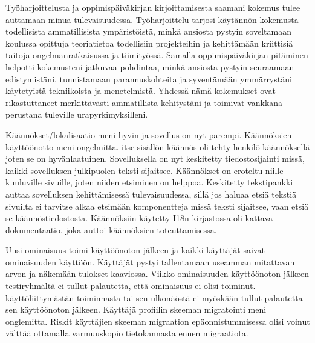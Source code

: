 \documentclass[11pt,a4paper,titlepage,oneside]{article}
\begin{document}
\medskip




%
Työharjoittelusta ja oppimispäiväkirjan kirjoittamisesta saamani kokemus tulee auttamaan minua tulevaisuudessa.
Työharjoittelu tarjosi käytännön kokemusta todellisista ammatillisista ympäristöistä,
minkä ansiosta pystyin soveltamaan koulussa opittuja teoriatietoa todellisiin projekteihin ja kehittämään kriittisiä taitoja 
ongelmanratkaisussa ja tiimityössä.
Samalla oppimispäiväkirjan pitäminen helpotti kokemusteni jatkuvaa pohdintaa,
minkä ansiosta pystyin seuraamaan edistymistäni,
tunnistamaan parannuskohteita ja syventämään ymmärrystäni käytetyistä tekniikoista ja menetelmistä.
Yhdessä nämä kokemukset ovat rikastuttaneet merkittävästi ammatillista kehitystäni ja toimivat vankkana perustana tuleville urapyrkimyksilleni.
\medskip













\iffalse

Käännökset/lokalisaatio meni hyvin ja sovellus on nyt parempi.
Käännöksien käyttöönotto meni ongelmitta.
itse sisällön käännös oli tehty henkilö käännöksellä joten se on hyvänlaatuinen.
%
Sovelluksella on nyt keskitetty tiedostosijainti missä, kaikki sovelluksen julkipuolen teksti sijaitsee.
Käännökset on eroteltu niille kuuluville sivuille, joten niiden etsiminen on helppoa.
Keskitetty tekstipankki auttaa sovelluksen kehittämisessä tulevaisuudessa,
sillä jos haluaa etsiä tekstiä sivuilta ei tarvitse alkaa etsimään komponentteja missä teksti sijaitsee,
vaan etsiä se käännöstiedostosta.
%
Käännöksiin käytetty I18n kirjastossa oli kattava dokumentaatio, joka auttoi käännöksien toteuttamisessa.
\medskip



Uusi ominaisuus toimi käyttöönoton jälkeen ja kaikki käyttäjät saivat ominaisuuden käyttöön.
Käyttäjät pystyi tallentamaan useamman mitattavan arvon ja näkemään tulokset kaaviossa. %
Viikko ominaisuuden käyttöönoton jälkeen testiryhmältä ei tullut palautetta, että ominaisuus ei olisi toiminut.
%
käyttöliittymästän toiminnasta tai sen ulkonäöstä ei myöskään tullut palautetta sen käyttöönoton jälkeen.
%
Käyttäjä profiilin skeeman migratointi meni onglemitta.
Riskit käyttäjien skeeman migraation epäonnistummisessa olisi voinut välttää ottamalla varmuuskopio tietokannasta ennen migraatiota.
\medskip
\end{document}
